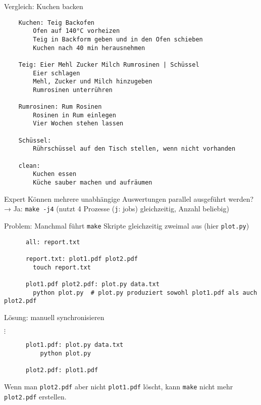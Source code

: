 
\begin{frame}[fragile]{Vergleich: Kuchen backen}
  \begin{center}
    \begin{verbatim}
    Kuchen: Teig Backofen
        Ofen auf 140°C vorheizen
        Teig in Backform geben und in den Ofen schieben
        Kuchen nach 40 min herausnehmen

    Teig: Eier Mehl Zucker Milch Rumrosinen | Schüssel
        Eier schlagen
        Mehl, Zucker und Milch hinzugeben
        Rumrosinen unterrühren

    Rumrosinen: Rum Rosinen
        Rosinen in Rum einlegen
        Vier Wochen stehen lassen

    Schüssel:
        Rührschüssel auf den Tisch stellen, wenn nicht vorhanden

    clean:
        Kuchen essen
        Küche sauber machen und aufräumen
    \end{verbatim}
  \end{center}
\end{frame}

\begin{frame}[fragile]{Expert}
  Können mehrere unabhängige Auswertungen parallel ausgeführt werden? \\
  → Ja: \;\texttt{make -j4}\; (nutzt 4 Prozesse (\texttt{j}: jobs) gleichzeitig, Anzahl beliebig)

  Problem: Manchmal führt \texttt{make} Skripte gleichzeitig zweimal aus (hier \texttt{plot.py})
  \begin{center}
    \begin{verbatim}
      all: report.txt

      report.txt: plot1.pdf plot2.pdf
        touch report.txt

      plot1.pdf plot2.pdf: plot.py data.txt
        python plot.py  # plot.py produziert sowohl plot1.pdf als auch plot2.pdf
    \end{verbatim}
  \end{center}

  Lösung: manuell synchronisieren
  \begin{center}
    $\vdots$ \\
    \begin{verbatim}
      plot1.pdf: plot.py data.txt
          python plot.py

      plot2.pdf: plot1.pdf
    \end{verbatim}
  \end{center}

  Wenn man \texttt{plot2.pdf} aber nicht \texttt{plot1.pdf} löscht, kann \texttt{make} nicht mehr \texttt{plot2.pdf} erstellen.
\end{frame}
